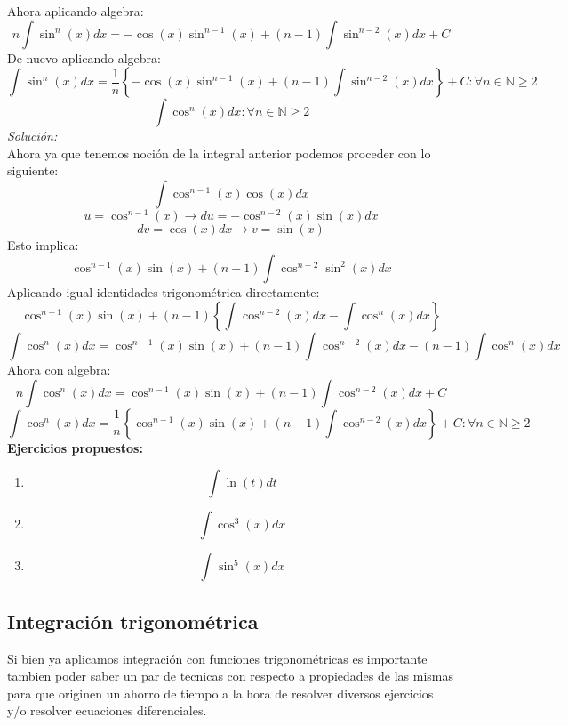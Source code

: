 \documentclass[10pt,executivepaper]{article}
\begin{document}
Ahora aplicando algebra:
\[n\int\sin^{n}(x)dx=-\cos(x)\sin^{n-1}(x) + (n-1)\int \sin^{n-2}(x)dx + C\]
De nuevo aplicando algebra:
\[\int\sin^{n}(x)dx=\frac{1}{n}\left\{-\cos(x)\sin^{n-1}(x) + (n-1)\int \sin^{n-2}(x)dx\right\} + C \colon \forall n\in\mathbb{N}\geq 2\]
\vspace{1cm}
\[\int \cos^{n}(x)dx \colon \forall n\in\mathbb{N}\geq 2\]
\textit{Solución:}\\
Ahora ya que tenemos noción de la integral anterior podemos proceder con lo siguiente:
\[\int\cos^{n-1}(x)\cos(x)dx\]
\[u=\cos^{n-1}(x)\rightarrow du=-\cos^{n-2}(x)\sin(x)dx\]
\[dv=\cos(x)dx \rightarrow v=\sin(x)\]
Esto implica:
\[\cos^{n-1}(x)\sin(x)+(n-1)\int\cos^{n-2}\sin^{2}(x)dx\]
Aplicando igual identidades trigonométrica directamente:
\[\cos^{n-1}(x)\sin(x)+(n-1)\left\{\int\cos^{n-2}(x)dx - \int\cos^{n}(x)dx\right\}\]
\[\int\cos^{n}(x)dx =\cos^{n-1}(x)\sin(x)+(n-1)\int\cos^{n-2}(x)dx-(n-1)\int\cos^{n}(x)dx\ \]
Ahora con algebra:
\[n\int\cos^{n}(x)dx =\cos^{n-1}(x)\sin(x)+(n-1)\int\cos^{n-2}(x)dx+C\]
\[\int\cos^{n}(x)dx =\frac{1}{n}\left\{\cos^{n-1}(x)\sin(x)+(n-1)\int\cos^{n-2}(x)dx\right\}+C \colon \forall n\in\mathbb{N}\geq 2\]
\textbf{Ejercicios propuestos:}
\begin{enumerate}
  \item \[\int\ln(t)dt\]
  \item \[\int \cos^{3}(x)dx\]
  \item \[\int \sin^{5}(x)dx\]
\end{enumerate}
\clearpage

\subsection{Integración trigonométrica}
Si bien ya aplicamos integración con funciones trigonométricas es importante tambien poder saber un par de tecnicas con respecto a propiedades de las mismas para que originen un ahorro de tiempo a la hora de resolver diversos ejercicios y/o resolver ecuaciones diferenciales.\\
\end{document}

